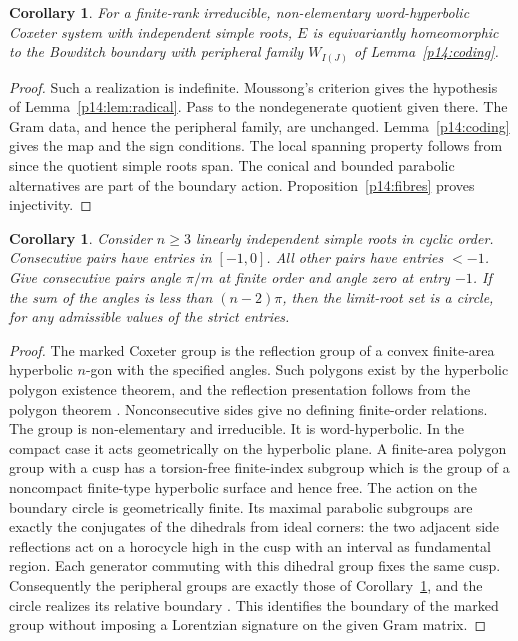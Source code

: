 \documentclass[11pt,reqno]{amsart}
\theoremstyle{plain}
\newtheorem{corollary}[theorem]{Corollary}
\theoremstyle{definition}
\theoremstyle{remark}
\numberwithin{equation}{section}
\begin{document}
\begin{corollary}\label{p14:whyp}
For a finite-rank irreducible, non-elementary word-hyperbolic Coxeter system with independent simple roots, $E$ is equivariantly homeomorphic to the Bowditch boundary with peripheral family $W_{I(J)}$ of Lemma~\ref{p14:coding}.
\end{corollary}
\begin{proof}
Such a realization is indefinite. Moussong's criterion gives the hypothesis of Lemma~\ref{p14:lem:radical}. Pass to the nondegenerate quotient given there. The Gram data, and hence the peripheral family, are unchanged. Lemma~\ref{p14:coding} gives the map and the sign conditions. The local spanning property follows from \cite[Lemma~3.8 and Theorem~6.12(a)]{DHR} since the quotient simple roots span. The conical and bounded parabolic alternatives are part of the boundary action. Proposition~\ref{p14:fibres} proves injectivity.
\end{proof}

\begin{corollary}\label{p14:poly}
Consider $n\ge3$ linearly independent simple roots in cyclic order. Consecutive pairs have entries in $[-1,0]$. All other pairs have entries $<-1$. Give consecutive pairs angle $\pi/m$ at finite order and angle zero at entry $-1$. If the sum of the angles is less than $(n-2)\pi$, then the limit-root set is a circle, for any admissible values of the strict entries.
\end{corollary}
\begin{proof}
The marked Coxeter group is the reflection group of a convex finite-area hyperbolic $n$-gon with the specified angles. Such polygons exist by the hyperbolic polygon existence theorem, and the reflection presentation follows from the polygon theorem \cite{Beardon1983,Davis2008}. Nonconsecutive sides give no defining finite-order relations. The group is non-elementary and irreducible. It is word-hyperbolic. In the compact case it acts geometrically on the hyperbolic plane. A finite-area polygon group with a cusp has a torsion-free finite-index subgroup which is the group of a noncompact finite-type hyperbolic surface and hence free. The action on the boundary circle is geometrically finite. Its maximal parabolic subgroups are exactly the conjugates of the dihedrals from ideal corners: the two adjacent side reflections act on a horocycle high in the cusp with an interval as fundamental region. Each generator commuting with this dihedral group fixes the same cusp. Consequently the peripheral groups are exactly those of Corollary~\ref{p14:whyp}, and the circle realizes its relative boundary \cite{Bowditch,Bowditch1993}. This identifies the boundary of the marked group without imposing a Lorentzian signature on the given Gram matrix.
\end{proof}
\end{document}
